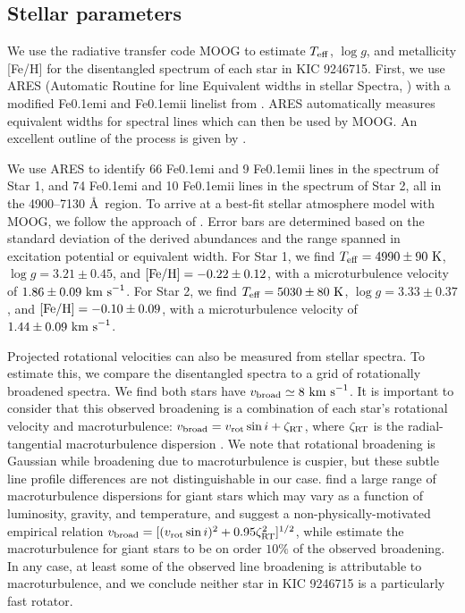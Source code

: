 \subsection{Stellar parameters}\label{parameters}
We use the radiative transfer code MOOG \citep{sne73} to estimate $T_{\rm{eff}}$, $\log g$, and metallicity [Fe/H] for the disentangled spectrum of each star in KIC 9246715. First, we use ARES (Automatic Routine for line Equivalent widths in stellar Spectra, \citealt{Sousa_2007}) with a modified {\rm Fe}\kern 0.1em{\sc i} and {\rm Fe}\kern 0.1em{\sc ii} linelist from \citet{tsa13}. ARES automatically measures equivalent widths for spectral lines which can then be used by MOOG. An excellent outline of the process is given by \citet{Sousa_2014}.

We use ARES to identify 66 {\rm Fe}\kern 0.1em{\sc i} and 9 {\rm Fe}\kern 0.1em{\sc ii} lines in the spectrum of Star 1, and 74 {\rm Fe}\kern 0.1em{\sc i} and 10 {\rm Fe}\kern 0.1em{\sc ii} lines in the spectrum of Star 2, all in the 4900--7130 \AA \ region. To arrive at a best-fit stellar atmosphere model with MOOG, we follow the approach of \citet{mag13}. Error bars are determined based on the standard deviation of the derived abundances and the range spanned in excitation potential or equivalent width. For Star 1, we find $T_{\rm{eff}} = 4990 \pm 90 \ \rm{K}$, $\log g = 3.21 \pm 0.45$, and $\rm{[Fe/H]} = -0.22 \pm 0.12$, with a microturbulence velocity of $1.86 \pm 0.09 \ \rm{km \ s}^{-1}$. For Star 2, we find $T_{\rm{eff}} = 5030 \pm 80 \ \rm{K}$, $\log g = 3.33 \pm 0.37$, and $\rm{[Fe/H]} = -0.10 \pm 0.09$, with a microturbulence velocity of $1.44 \pm 0.09 \ \rm{km \ s}^{-1}$.

Projected rotational velocities can also be measured from stellar spectra. To estimate this, we compare the disentangled spectra to a grid of rotationally broadened spectra. We find both stars have $v_{\rm{broad}} \simeq 8 \ \rm{km \ s}^{-1}$. It is important to consider that this observed broadening is a combination of each star's rotational velocity and macroturbulence: $v_{\rm{broad}} = v_{\rm{rot}} \sin i + \zeta_{\rm{RT}}$, where $\zeta_{\rm{RT}}$ is the radial-tangential macroturbulence dispersion \citep{gra78}. We note that rotational broadening is Gaussian while broadening due to macroturbulence is cuspier, but these subtle line profile differences are not distinguishable in our case. \citet{car08} find a large range of macroturbulence dispersions for giant stars which may vary as a function of luminosity, gravity, and temperature, and suggest a non-physically-motivated empirical relation $v_{\rm{broad}} = [(v_{\rm{rot}} \sin i)^2 + 0.95\zeta_{\rm{RT}}^2]^{1/2}$, while \citet{tay15} estimate the macroturbulence for giant stars to be on order $10 \%$ of the observed broadening. In any case, at least some of the observed line broadening is attributable to macroturbulence, and we conclude neither star in KIC 9246715 is a particularly fast rotator.
